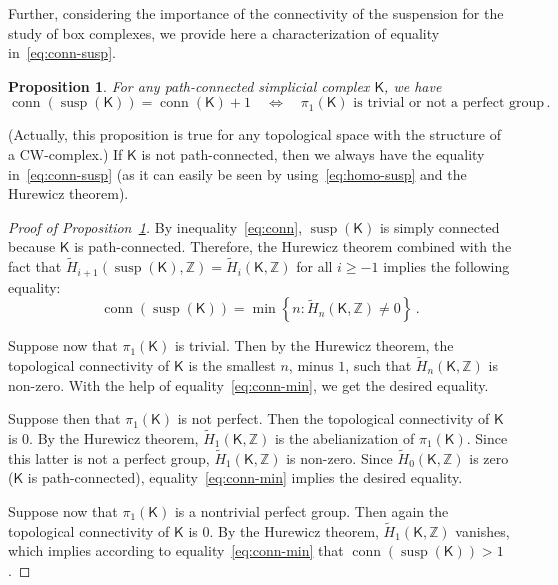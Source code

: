 \documentclass[12pt]{amsart}
\newtheorem{proposition}[theorem]{Proposition}
\theoremstyle{definition}
\def\Z{\mathbb{Z}}
\def\K{\mathsf{K}}
\renewcommand{\geq}{\geqslant}
\def\susp{\operatorname{susp}}
\def\conn{\operatorname{conn}}
\begin{document}
Further, considering the importance of the connectivity of the suspension for the study of box complexes, we provide here a characterization of equality in~\eqref{eq:conn-susp}.

\begin{proposition}\label{prop:susp-perfect}
For any path-connected simplicial complex $\K$, we have 
\[
\conn(\susp(\K)) = \conn(\K) + 1 \quad \Longleftrightarrow \quad  \pi_1(\K) \text{ is trivial or not a perfect group} \, .
\]
\end{proposition}

(Actually, this proposition is true for any topological space with the structure of a CW-complex.) If $\K$ is not path-connected, then we always have the equality in~\eqref{eq:conn-susp} (as it can easily be seen by using~\eqref{eq:homo-susp} and the Hurewicz theorem).

\begin{proof}[Proof of Proposition~\ref{prop:susp-perfect}] By inequality~\eqref{eq:conn}, $\susp(\K)$ is simply connected because $\K$ is path-connected. Therefore, the Hurewicz theorem combined with the fact that 
$\widetilde H_{i+1}(\susp(\K),\Z) = \widetilde H_i(\K,\Z)$ for all $i\geq -1$ implies the following equality:
\begin{equation}\label{eq:conn-min}
\conn(\susp(\K)) = {\min}{\left\{n \colon \widetilde H_n(\K,\Z) \neq 0\right\}} \,.
\end{equation}


Suppose now that $\pi_1(\K)$ is trivial. Then by the Hurewicz theorem, the topological connectivity of $\K$ is the smallest $n$, minus $1$, such that $\widetilde H_n(\K,\Z)$ is non-zero. With the help of equality~\eqref{eq:conn-min}, we get the desired equality.

Suppose then that $\pi_1(\K)$ is not perfect. Then the topological connectivity of $\K$ is $0$. By the Hurewicz theorem, $\widetilde H_1(\K,\Z)$ is the abelianization of $\pi_1(\K)$. Since this latter is not a perfect group, $\widetilde H_1(\K,\Z)$ is non-zero. Since $\widetilde H_0(\K,\Z)$ is zero ($\K$ is path-connected), equality~\eqref{eq:conn-min} implies the desired equality.

Suppose now that $\pi_1(\K)$ is a nontrivial perfect group. Then again the topological connectivity of $\K$ is $0$. By the Hurewicz theorem, $\widetilde H_1(\K,\Z)$ vanishes, which implies according to equality~\eqref{eq:conn-min} that $\conn(\susp(\K)) > 1$.
\end{proof}
\end{document}
